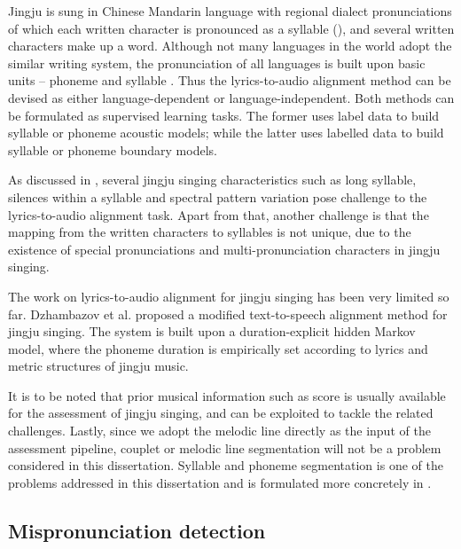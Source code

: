 Jingju is sung in Chinese Mandarin language with regional dialect pronunciations of which each written character is pronounced as a syllable (), and several written characters make up a word. Although not many languages in the world adopt the similar writing system, the pronunciation of all languages is built upon basic units -- phoneme and syllable \cite{Moran2014}. Thus the lyrics-to-audio alignment method can be devised as either language-dependent or language-independent. Both methods can be formulated as supervised learning tasks. The former uses label data to build syllable or phoneme acoustic models; while the latter uses labelled data to build syllable or phoneme boundary models.

As discussed in , several jingju singing characteristics such as long syllable, silences within a syllable and spectral pattern variation pose challenge to the lyrics-to-audio alignment task. Apart from that, another challenge is that the mapping from the written characters to syllables is not unique, due to the existence of special pronunciations and multi-pronunciation characters in jingju singing.

The work on lyrics-to-audio alignment for jingju singing has been very limited so far. Dzhambazov et al. \cite{dzhambazov_modeling_2015} proposed a modified text-to-speech alignment method for jingju singing. The system is built upon a duration-explicit hidden Markov model, where the phoneme duration is empirically set according to lyrics and metric structures of jingju music.

It is to be noted that prior musical information such as score is usually available for the assessment of jingju singing, and can be exploited to tackle the related challenges. Lastly, since we adopt the melodic line directly as the input of the assessment pipeline, couplet or melodic line segmentation will not be a problem considered in this dissertation. Syllable and phoneme segmentation is one of the problems addressed in this dissertation and is formulated more concretely in .

\subsection{Mispronunciation detection}\label{sec:ch3:mispronunciation_challenge}

